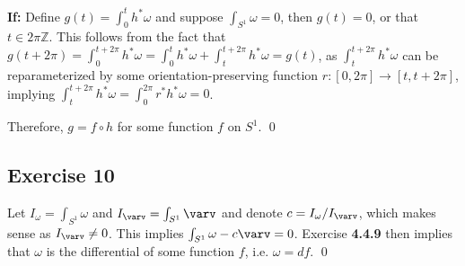 \documentclass{article}
\newcommand{\Z}{\mathbb{Z}}
\begin{document}
    \textbf{If:} Define $g(t)=\int_0^th^*\omega$ and suppose $\int_{S^1}\omega=
    0$, then $g(t)=0$, or that $t\in2\pi\Z$. This follows from the fact that
    $g(t+2\pi)=\int_0^{t+2\pi}h^*\omega=\int_0^th^*\omega+\int_t^{t+2\pi}h^*
    \omega=g(t)$, as $\int_t^{t+2\pi}h^*\omega$ can be reparameterized by some
    orientation-preserving function $r\colon[0,2\pi]\to[t,t+2\pi]$, implying
    $\int_t^{t+2\pi}h^*\omega=\int_0^{2\pi}r^*h^*\omega=0$.

    Therefore, $g=f\circ h$ for some function $f$ on $S^1$.
    \qed

  \subsection*{Exercise 10}
    Let $I_\omega=\int_{S^1}\omega$ and $I_\varv=\int_{S^1}\varv$ and denote
    $c=I_\omega/I_\varv$, which makes sense as $I_\varv\ne0$. This implies
    $\int_{S^1}\omega-c\varv=0$. Exercise \textbf{4.4.9} then implies that
    $\omega$ is the differential of some function $f$, i.e. $\omega=df$.
    \qed
\end{document}

